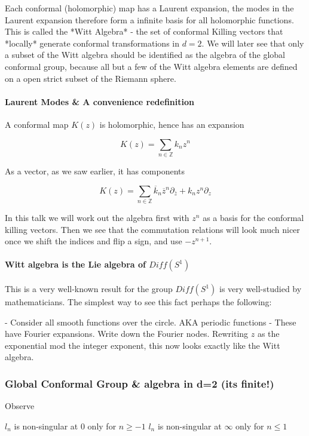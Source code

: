 Each conformal (holomorphic) map has a Laurent expansion, the modes in the Laurent expansion therefore form a infinite basis for all holomorphic functions. This is called the *Witt Algebra* - the set of conformal Killing vectors that *locally* generate conformal transformations in $d=2$. We will later see that only a subset of the Witt algebra should be identified as the algebra of the global conformal group, because all but a few of the Witt algebra elements are defined on a  open strict subset of the Riemann sphere.


\paragraph{ Laurent Modes \& A convenience redefinition}
A conformal map $K(z)$ is holomorphic, hence has an expansion

$$K(z) = \sum_{n \in \mathbb{Z}} k_n z^n$$

As a vector, as we saw earlier, it has components

$$ K(z) = \sum_{n \in \mathbb{Z}} \overline k_n \overline z^n \partial_{\bar z} +  k_n z^n\partial_z$$


In this talk we will work out the algebra first with $z^n$ as a basis for the conformal killing vectors. Then we see that the commutation relations will look much nicer once we shift the indices and flip a sign, and use $-z^{n+1}$.



\paragraph{ Witt algebra is the Lie algebra of $Diff(S^1)$}

This is a very well-known result for the group $Diff(S^1)$ is very well-studied by mathematicians. The simplest way to see this fact perhaps the following:

- Consider all smooth functions over the circle. AKA periodic functions
- These have Fourier expansions. Write down the Fourier nodes. Rewriting $z$ as the exponential mod the integer exponent, this now looks exactly like the Witt algebra.


\subsubsection{ Global Conformal Group \& algebra in d=2 (its finite!)}

Observe

$l_n$ is non-singular at $0$ only for $n \ge -1$
$l_n$ is non-singular at $\infty$ only for $n \le 1$

